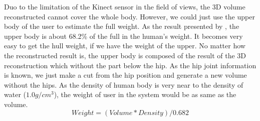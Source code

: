 Duo to the limitation of the Kinect sensor in the field of views, the 3D volume reconstructed cannot cover the whole body. However, we could just use the upper body of the user to estimate the full weight. As the result presented by \cite{Tozeren2000}, the upper body is about 68.2\% of the full in the human's weight. It becomes very easy to get the hull weight, if we have the weight of the upper. No matter how the reconstructed result is, the upper body is composed of the result of the 3D reconstruction which without the part below the hip. As the hip joint information is known, we just make a cut from the hip position and generate a new volume without the hips.
As the density of human body is very near to the density of water ($1.0 g/cm^3$), the weight of user in the system would be as same as the volume.
\begin{equation}
Weight = (Volume * Density)/0.682
\end{equation}

